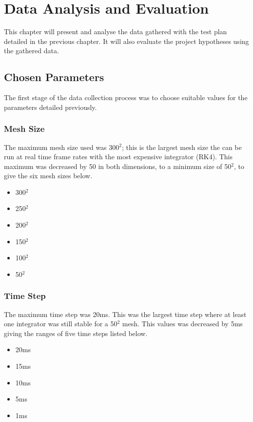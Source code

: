\chapter{Data Analysis and Evaluation}
\label{sec:eval}

This chapter will present and analyse the data gathered with the test plan detailed in the previous chapter. It will also evaluate the project hypotheses using the gathered data.

\section{Chosen Parameters}
The first stage of the data collection process was to choose suitable values for the parameters detailed previously.

\subsection{Mesh Size}
The maximum mesh size used was 300$^{2}$; this is the largest mesh size the can be run at real time frame rates with the most expensive integrator (RK4). This maximum was decreased by 50 in both dimensions, to a minimum size of 50$^{2}$, to give the six mesh sizes below.
\begin{itemize}
\item{300$^{2}$}
\item{250$^{2}$}
\item{200$^{2}$}
\item{150$^{2}$}
\item{100$^{2}$}
\item{50$^{2}$}
\end{itemize}

\subsection{Time Step}
The maximum time step was 20ms. This was the largest time step where at least one integrator was still stable for a 50$^{2}$ mesh. This values was decreased by 5ms giving the ranges of five time steps listed below.
\begin{itemize}
\item{20ms}
\item{15ms}
\item{10ms}
\item{5ms}
\item{1ms}
\end{itemize}

